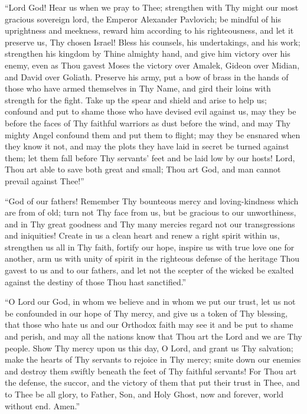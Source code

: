 ``Lord God! Hear us when we pray to Thee; strengthen with Thy
might our most gracious sovereign lord, the Emperor Alexander
Pavlovich; be mindful of his uprightness and meekness, reward him
according to his righteousness, and let it preserve us, Thy
chosen Israel! Bless his counsels, his undertakings, and his
work; strengthen his kingdom by Thine almighty hand, and give him
victory over his enemy, even as Thou gavest Moses the victory
over Amalek, Gideon over Midian, and David over Goliath. Preserve
his army, put a bow of brass in the hands of those who have armed
themselves in Thy Name, and gird their loins with strength for
the fight. Take up the spear and shield and arise to help us;
confound and put to shame those who have devised evil against us,
may they be before the faces of Thy faithful warriors as dust
before the wind, and may Thy mighty Angel confound them and put
them to flight; may they be ensnared when they know it not, and
may the plots they have laid in secret be turned against them;
let them fall before Thy servants' feet and be laid low by our
hosts! Lord, Thou art able to save both great and small; Thou art
God, and man cannot prevail against Thee!''

``God of our fathers! Remember Thy bounteous mercy and
loving-kindness which are from of old; turn not Thy face from us,
but be gracious to our unworthiness, and in Thy great goodness
and Thy many mercies regard not our transgressions and
iniquities! Create in us a clean heart and renew a right spirit
within us, strengthen us all in Thy faith, fortify our hope,
inspire us with true love one for another, arm us with unity of
spirit in the righteous defense of the heritage Thou gavest to us
and to our fathers, and let not the scepter of the wicked be
exalted against the destiny of those Thou hast sanctified.''

``O Lord our God, in whom we believe and in whom we put our
trust, let us not be confounded in our hope of Thy mercy, and
give us a token of Thy blessing, that those who hate us and our
Orthodox faith may see it and be put to shame and perish, and may
all the nations know that Thou art the Lord and we are Thy
people. Show Thy mercy upon us this day, O Lord, and grant us Thy
salvation; make the hearts of Thy servants to rejoice in Thy
mercy; smite down our enemies and destroy them swiftly beneath
the feet of Thy faithful servants! For Thou art the defense, the
succor, and the victory of them that put their trust in Thee, and
to Thee be all glory, to Father, Son, and Holy Ghost, now and
forever, world without end. Amen.''

